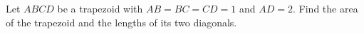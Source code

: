 Let $ABCD$ be a trapezoid with $AB=BC=CD=1$ and $AD=2$. Find the area of the trapezoid and the lengths of its two diagonals.
